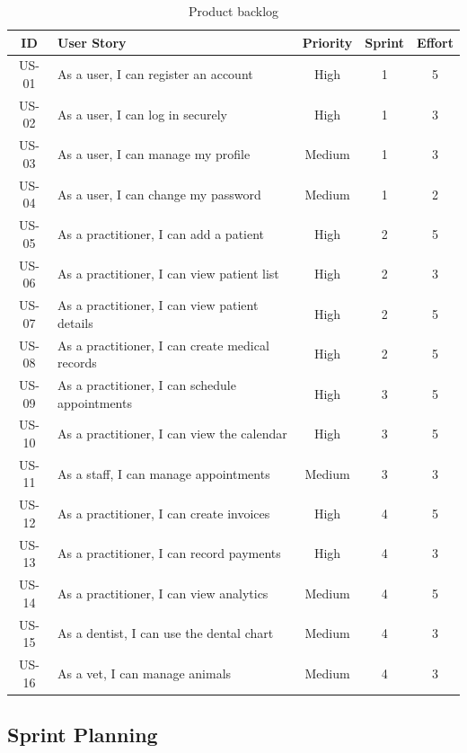 \documentclass[12pt,a4paper,oneside]{report}
\begin{document}
\begin{table}[H]
\centering
\caption{Product backlog}
\label{tab:product_backlog}
\begin{tabular}{|c|p{5.5cm}|c|c|c|}
\hline
\textbf{ID} & \textbf{User Story} & \textbf{Priority} & \textbf{Sprint} & \textbf{Effort} \\
\hline
US-01 & As a user, I can register an account & High & 1 & 5 \\
\hline
US-02 & As a user, I can log in securely & High & 1 & 3 \\
\hline
US-03 & As a user, I can manage my profile & Medium & 1 & 3 \\
\hline
US-04 & As a user, I can change my password & Medium & 1 & 2 \\
\hline
US-05 & As a practitioner, I can add a patient & High & 2 & 5 \\
\hline
US-06 & As a practitioner, I can view patient list & High & 2 & 3 \\
\hline
US-07 & As a practitioner, I can view patient details & High & 2 & 5 \\
\hline
US-08 & As a practitioner, I can create medical records & High & 2 & 5 \\
\hline
US-09 & As a practitioner, I can schedule appointments & High & 3 & 5 \\
\hline
US-10 & As a practitioner, I can view the calendar & High & 3 & 5 \\
\hline
US-11 & As a staff, I can manage appointments & Medium & 3 & 3 \\
\hline
US-12 & As a practitioner, I can create invoices & High & 4 & 5 \\
\hline
US-13 & As a practitioner, I can record payments & High & 4 & 3 \\
\hline
US-14 & As a practitioner, I can view analytics & Medium & 4 & 5 \\
\hline
US-15 & As a dentist, I can use the dental chart & Medium & 4 & 3 \\
\hline
US-16 & As a vet, I can manage animals & Medium & 4 & 3 \\
\hline
\end{tabular}
\end{table}

\subsection{Sprint Planning}
\end{document}

